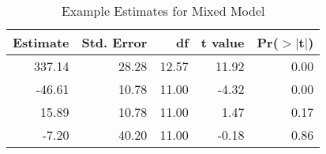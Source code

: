 \begin{table}[ht]
\centering
\begin{tabular}{rrrrr}
  \hline
Estimate & Std. Error & df & t value & Pr($>$$|$t$|$) \\ 
  \hline
337.14 & 28.28 & 12.57 & 11.92 & 0.00 \\ 
  -46.61 & 10.78 & 11.00 & -4.32 & 0.00 \\ 
  15.89 & 10.78 & 11.00 & 1.47 & 0.17 \\ 
  -7.20 & 40.20 & 11.00 & -0.18 & 0.86 \\ 
   \hline
\end{tabular}
\caption{Example Estimates for Mixed Model} 
\label{modelTable}
\end{table}

